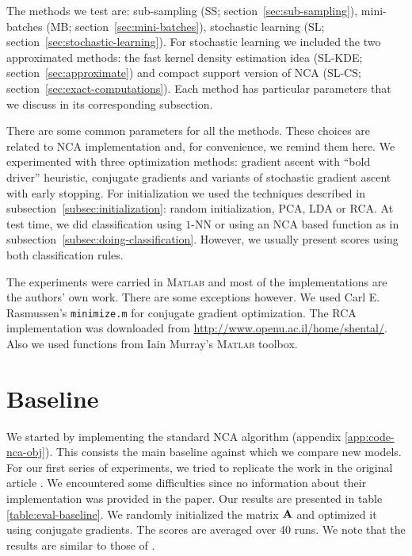 The methods we test are: sub-sampling (SS; section~\ref{sec:sub-sampling}), mini-batches (MB; section~\ref{sec:mini-batches}), stochastic learning (SL; section~\ref{sec:stochastic-learning}). For stochastic learning we included the two approximated methods: the fast kernel density estimation idea (SL-KDE; section~\ref{sec:approximate}) and compact support version of NCA (SL-CS; section~\ref{sec:exact-computations}). Each method has particular parameters that we discuss in its corresponding subsection.

There are some common parameters for all the methods. These choices are related to NCA implementation and, for convenience, we remind them here. We experimented with three optimization methods: gradient ascent with ``bold driver'' heuristic, conjugate gradients and variants of stochastic gradient ascent with early stopping. For initialization we used the techniques described in subsection~\ref{subsec:initialization}: random initialization, PCA, LDA or RCA. At test time, we did classification using $1$-NN or using an NCA based function as in subsection~\ref{subsec:doing-classification}. However, we usually present scores using both classification rules.

The experiments were carried in \textsc{Matlab} and most of the implementations are the authors' own work. There are some exceptions however. We used Carl E. Rasmussen's \texttt{minimize.m} for conjugate gradient optimization. The RCA implementation was downloaded from \url{http://www.openu.ac.il/home/shental/}. Also we used functions from Iain Murray's \textsc{Matlab} toolbox. 

\section{Baseline}
\label{sec:baseline} 

We started by implementing the standard NCA algorithm (appendix \ref{app:code-nca-obj}). This consists the main baseline against which we compare new models.  
For our first series of experiments, we tried to replicate the work in the original article \citep{goldberger2004}. We encountered some difficulties since no information about their implementation was provided in the paper. Our results are presented in table \ref{table:eval-baseline}. We randomly initialized the matrix $\mathbf{A}$ and optimized it using conjugate gradients. The scores are averaged over 40 runs. We note that the results are similar to those of \citet{goldberger2004}. 

